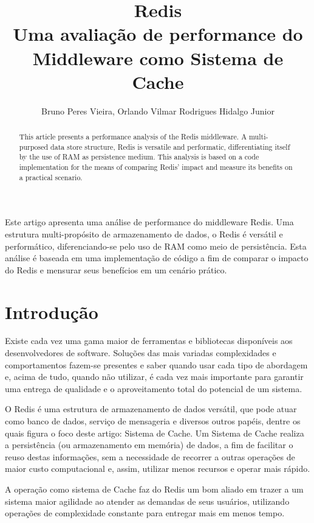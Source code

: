 \documentclass[12pt]{article}
\title{Redis\\Uma avaliação de performance do Middleware como Sistema de Cache}
\author{Bruno Peres Vieira\inst{1}, Orlando Vilmar Rodrigues Hidalgo Junior\inst{1} }
\begin{document}
 

\maketitle

\begin{abstract}
This article presents a performance analysis of the Redis middleware. A multi-purposed data store structure, Redis is versatile and performatic, differentiating itself by the use of RAM as persistence medium. This analysis is based on a code implementation for the means of comparing Redis' impact and measure its benefits on a practical scenario.
\end{abstract}
     
\begin{resumo} 
Este artigo apresenta uma análise de performance do middleware Redis. Uma estrutura multi-propósito de armazenamento de dados, o Redis é versátil e performático, diferenciando-se pelo uso de RAM como meio de persistência. Esta análise é baseada em uma implementação de código a fim de comparar o impacto do Redis e mensurar seus benefícios em um cenário prático.
\end{resumo}


\section{Introdução}

Existe cada vez uma gama maior de ferramentas e bibliotecas disponíveis aos desenvolvedores de software. Soluções das mais variadas complexidades e comportamentos fazem-se presentes e saber quando usar cada tipo de abordagem e, acima de tudo, quando não utilizar, é cada vez mais importante para garantir uma entrega de qualidade e o aproveitamento total do potencial de um sistema.

O Redis é uma estrutura de armazenamento de dados versátil, que pode atuar como banco de dados, serviço de mensageria e diversos outros papéis, dentre os quais figura o foco deste artigo: Sistema de Cache. Um Sistema de Cache realiza a persistência (ou armazenamento em memória) de dados, a fim de facilitar o reuso destas informações, sem a necessidade de recorrer a outras operações de maior custo computacional e, assim, utilizar menos recursos e operar mais rápido.

A operação como sistema de Cache faz do Redis um bom aliado em trazer a um sistema maior agilidade ao atender as demandas de seus usuários, utilizando operações de complexidade constante para entregar mais em menos tempo.
\end{document}
